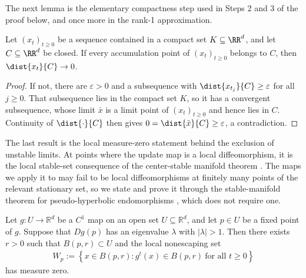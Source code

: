 \documentclass{article}
\begin{document}
The next lemma is the elementary compactness step used in Steps 2 and 3 of the
proof below, and once more in the rank-1 approximation.

\begin{lemma}\label{lem:setwise_from_accumulation}
Let $(x_t)_{t\ge0}$ be a sequence contained in a compact set
$K\subseteq\RR^d$, and let $C\subseteq\RR^d$ be closed. If every accumulation
point of $(x_t)_{t\ge0}$ belongs to $C$, then $\dist{x_t}{C}\to0$.
\end{lemma}
\begin{proof}
If not, there are $\varepsilon>0$ and a subsequence with
$\dist{x_{t_j}}{C}\ge\varepsilon$ for all $j\ge 0$. That subsequence lies in the
compact set $K$, so it has a convergent subsequence, whose limit
$\bar x$ is a limit point of $(x_t)_{t\ge0}$ and hence lies in $C$.
Continuity of $\dist{\cdot}{C}$ then gives
$0=\dist{\bar x}{C}\ge\varepsilon$, a contradiction.
\end{proof}

The last result is the local measure-zero statement behind the exclusion of
unstable limits. At points where the update map is a local
diffeomorphism, it is the local stable-set consequence of the center-stable
manifold theorem \citep[Theorem~III.7]{shub2013global}. The maps we apply it to
may fail to be local diffeomorphisms at finitely many points of the relevant
stationary set, so we state and prove it through the stable-manifold theorem
for pseudo-hyperbolic endomorphisms
\citep[Theorem~5.1]{hirsch1977invariant}, which does not require one.

\begin{corollary}
\label{cor:local_nonescaping_unstable_fixed_point}
Let $g:U\to \mathbb R^d$ be a $C^1$ map on an open set
$U\subseteq \mathbb R^d$, and let $p\in U$ be a fixed point of $g$.
Suppose that $Dg(p)$ has an eigenvalue $\lambda$ with $|\lambda|>1$.
Then there exists $r>0$ such that $B(p,r)\subset U$ and the local
nonescaping set
\begin{align}
    W_p
    :=
    \left\{
        x\in B(p,r):
        g^t(x)\in B(p,r)\ \text{for all }t\ge 0
    \right\}
\end{align}
has measure zero.
\end{corollary}
\end{document}
